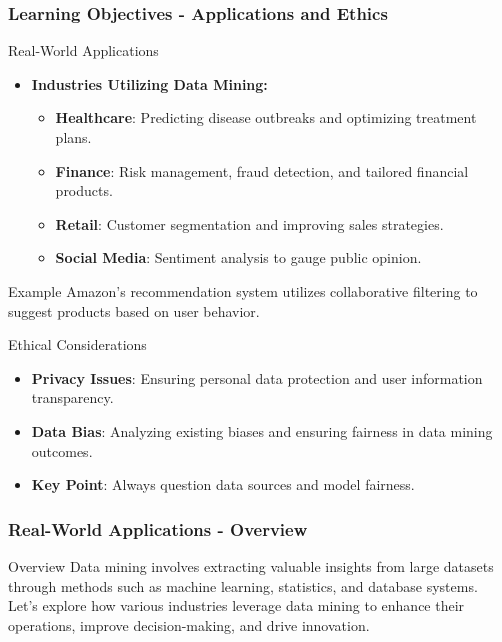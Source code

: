 \documentclass[aspectratio=169]{beamer}
\begin{document}
\begin{frame}[fragile]
    \frametitle{Learning Objectives - Applications and Ethics}
    \begin{block}{Real-World Applications}
        \begin{itemize}
            \item \textbf{Industries Utilizing Data Mining:}
            \begin{itemize}
                \item \textbf{Healthcare}: Predicting disease outbreaks and optimizing treatment plans.
                \item \textbf{Finance}: Risk management, fraud detection, and tailored financial products.
                \item \textbf{Retail}: Customer segmentation and improving sales strategies.
                \item \textbf{Social Media}: Sentiment analysis to gauge public opinion.
            \end{itemize}
        \end{itemize}
    \end{block}
    \begin{block}{Example}
        Amazon's recommendation system utilizes collaborative filtering to suggest products based on user behavior.
    \end{block}
    \begin{block}{Ethical Considerations}
        \begin{itemize}
            \item \textbf{Privacy Issues}: Ensuring personal data protection and user information transparency.
            \item \textbf{Data Bias}: Analyzing existing biases and ensuring fairness in data mining outcomes.
            \item \textbf{Key Point}: Always question data sources and model fairness.
        \end{itemize}
    \end{block}
\end{frame}

\begin{frame}[fragile]
    \frametitle{Real-World Applications - Overview}
    \begin{block}{Overview}
        Data mining involves extracting valuable insights from large datasets through methods such as machine learning, statistics, and database systems. 
        Let's explore how various industries leverage data mining to enhance their operations, improve decision-making, and drive innovation.
    \end{block}
\end{frame}
\end{document}
